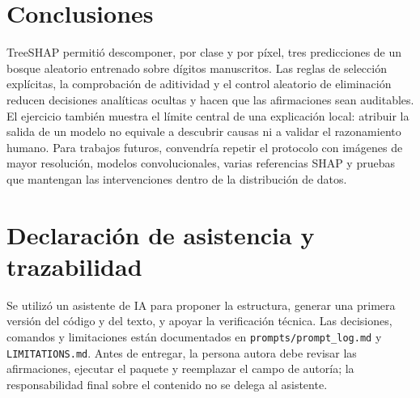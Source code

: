 \documentclass[11pt,letterpaper]{article}
\begin{document}
\section{Conclusiones}

TreeSHAP permitió descomponer, por clase y por píxel, tres predicciones de un bosque
aleatorio entrenado sobre dígitos manuscritos. Las reglas de selección explícitas, la
comprobación de aditividad y el control aleatorio de eliminación reducen decisiones
analíticas ocultas y hacen que las afirmaciones sean auditables. El ejercicio también
muestra el límite central de una explicación local: atribuir la salida de un modelo no
equivale a descubrir causas ni a validar el razonamiento humano. Para trabajos futuros,
convendría repetir el protocolo con imágenes de mayor resolución, modelos convolucionales,
varias referencias SHAP y pruebas que mantengan las intervenciones dentro de la
distribución de datos.

\section*{Declaración de asistencia y trazabilidad}

Se utilizó un asistente de IA para proponer la estructura, generar una primera versión
del código y del texto, y apoyar la verificación técnica. Las decisiones, comandos y
limitaciones están documentados en \texttt{prompts/prompt\_log.md} y
\texttt{LIMITATIONS.md}. Antes de entregar, la persona autora debe revisar las
afirmaciones, ejecutar el paquete y reemplazar el campo de autoría; la responsabilidad
final sobre el contenido no se delega al asistente.



\end{document}

